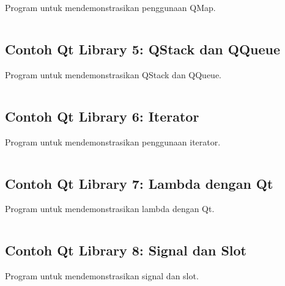 Program untuk mendemonstrasikan penggunaan QMap.

\begin{lstlisting}[language=c++, caption=QMap Container]

\end{lstlisting}

\subsection{Contoh Qt Library 5: QStack dan QQueue}

Program untuk mendemonstrasikan QStack dan QQueue.

\begin{lstlisting}[language=c++, caption=QStack dan QQueue]

\end{lstlisting}

\subsection{Contoh Qt Library 6: Iterator}

Program untuk mendemonstrasikan penggunaan iterator.

\begin{lstlisting}[language=c++, caption=Iterator]

\end{lstlisting}

\subsection{Contoh Qt Library 7: Lambda dengan Qt}

Program untuk mendemonstrasikan lambda dengan Qt.

\begin{lstlisting}[language=c++, caption=Lambda dengan Qt]

\end{lstlisting}

\subsection{Contoh Qt Library 8: Signal dan Slot}

Program untuk mendemonstrasikan signal dan slot.

\begin{lstlisting}[language=c++, caption=Signal dan Slot]

\end{lstlisting}

